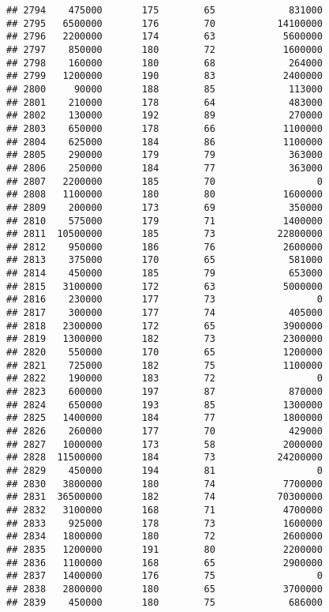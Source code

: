 \documentclass[
]{article}
\begin{document}
\begin{verbatim}
## 2794    475000       175        65             831000
## 2795   6500000       176        70           14100000
## 2796   2200000       174        63            5600000
## 2797    850000       180        72            1600000
## 2798    160000       180        68             264000
## 2799   1200000       190        83            2400000
## 2800     90000       188        85             113000
## 2801    210000       178        64             483000
## 2802    130000       192        89             270000
## 2803    650000       178        66            1100000
## 2804    625000       184        86            1100000
## 2805    290000       179        79             363000
## 2806    250000       184        77             363000
## 2807   2200000       185        70                  0
## 2808   1100000       180        80            1600000
## 2809    200000       173        69             350000
## 2810    575000       179        71            1400000
## 2811  10500000       185        73           22800000
## 2812    950000       186        76            2600000
## 2813    375000       170        65             581000
## 2814    450000       185        79             653000
## 2815   3100000       172        63            5000000
## 2816    230000       177        73                  0
## 2817    300000       177        74             405000
## 2818   2300000       172        65            3900000
## 2819   1300000       182        73            2300000
## 2820    550000       170        65            1200000
## 2821    725000       182        75            1100000
## 2822    190000       183        72                  0
## 2823    600000       197        87             870000
## 2824    650000       193        85            1300000
## 2825   1400000       184        77            1800000
## 2826    260000       177        70             429000
## 2827   1000000       173        58            2000000
## 2828  11500000       184        73           24200000
## 2829    450000       194        81                  0
## 2830   3800000       180        74            7700000
## 2831  36500000       182        74           70300000
## 2832   3100000       168        71            4700000
## 2833    925000       178        73            1600000
## 2834   1800000       180        72            2600000
## 2835   1200000       191        80            2200000
## 2836   1100000       168        65            2900000
## 2837   1400000       176        75                  0
## 2838   2800000       180        65            3700000
## 2839    450000       180        75             686000

\end{verbatim}
\end{document}
